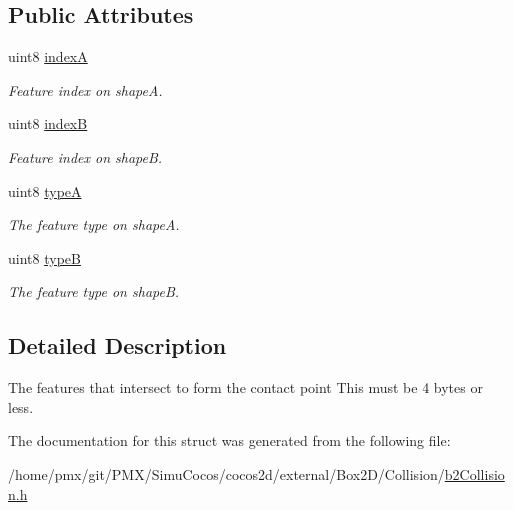\subsection*{Public Attributes}
\begin{DoxyCompactItemize}
\item 
\mbox{\label{structb2ContactFeature_a833bc746e7cb5e3cd458f1c0809101d0}} 
uint8 \hyperlink{structb2ContactFeature_a833bc746e7cb5e3cd458f1c0809101d0}{indexA}
\begin{DoxyCompactList}\small\item\em Feature index on shapeA. \end{DoxyCompactList}\item 
\mbox{\label{structb2ContactFeature_ad96712b6a0cc1f4b22b85b5948eab81d}} 
uint8 \hyperlink{structb2ContactFeature_ad96712b6a0cc1f4b22b85b5948eab81d}{indexB}
\begin{DoxyCompactList}\small\item\em Feature index on shapeB. \end{DoxyCompactList}\item 
\mbox{\label{structb2ContactFeature_a3361b651f0a88fb60ec6aba9f4921cc2}} 
uint8 \hyperlink{structb2ContactFeature_a3361b651f0a88fb60ec6aba9f4921cc2}{typeA}
\begin{DoxyCompactList}\small\item\em The feature type on shapeA. \end{DoxyCompactList}\item 
\mbox{\label{structb2ContactFeature_abb74afd6ee5b60834a3f8e2616182bdf}} 
uint8 \hyperlink{structb2ContactFeature_abb74afd6ee5b60834a3f8e2616182bdf}{typeB}
\begin{DoxyCompactList}\small\item\em The feature type on shapeB. \end{DoxyCompactList}\end{DoxyCompactItemize}


\subsection{Detailed Description}
The features that intersect to form the contact point This must be 4 bytes or less. 

The documentation for this struct was generated from the following file\+:\begin{DoxyCompactItemize}
\item 
/home/pmx/git/\+P\+M\+X/\+Simu\+Cocos/cocos2d/external/\+Box2\+D/\+Collision/\hyperlink{cocos2d_2external_2Box2D_2Collision_2b2Collision_8h}{b2\+Collision.\+h}\end{DoxyCompactItemize}
